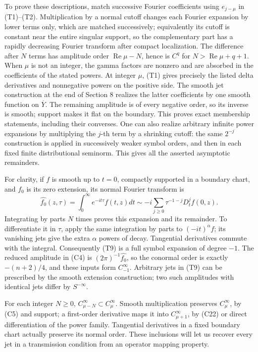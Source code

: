 \documentclass[
  11pt,
]{article}
\begin{document}
To prove these descriptions, match successive Fourier coefficients using
\(e_{j-\mu}\) in (T1)--(T2). Multiplication by a normal cutoff changes
each Fourier expansion by lower terms only, which are matched
successively; equivalently its cutoff is constant near the entire
singular support, so the complementary part has a rapidly decreasing
Fourier transform after compact localization. The difference after \(N\)
terms has amplitude order \(\operatorname{Re}\mu-N\), hence is \(C^q\)
for \(N>\operatorname{Re}\mu+q+1\). When \(\mu\) is not an integer, the
gamma factors are nonzero and are absorbed in the coefficients of the
stated powers. At integer \(\mu\), (T1) gives precisely the listed delta
derivatives and nonnegative powers on the positive side. The smooth jet
construction at the end of Section 8 realizes the latter coefficients by
one smooth function on \(\overline Y\). The remaining amplitude is of
every negative order, so its inverse is smooth; support makes it flat on
the boundary. This proves exact membership statements, including their
converses. One can also realize arbitrary infinite power expansions by
multiplying the \(j\)-th term by a shrinking cutoff: the same \(2^{-j}\)
construction is applied in successively weaker symbol orders, and then
in each fixed finite distributional seminorm. This gives all the
asserted asymptotic remainders.

For clarity, if \(f\) is smooth up to \(t=0\), compactly supported in a
boundary chart, and \(f_0\) is its zero extension, its normal Fourier
transform is \[
\widehat {f_0}(z,\tau)=\int_0^\infty e^{-it\tau}f(t,z)dt
\sim-i\sum_{j\geq0}\tau^{-1-j}D_t^j f(0,z).
\tag{T9}
\] Integrating by parts \(N\) times proves this expansion and its
remainder. To differentiate it in \(\tau\), apply the same integration
by parts to \((-it)^\alpha f\); its vanishing jets give the extra
\(\alpha\) powers of decay. Tangential derivatives commute with the
integral. Consequently (T9) is a full symbol expansion of degree \(-1\).
The reduced amplitude in (C4) is \((2\pi)^{-1}\widehat {f_0}\), so the
conormal order is exactly \(-(n+2)/4\), and these inputs form
\(C_{-1}^\infty\). Arbitrary jets in (T9) can be prescribed by the
smooth extension construction; two such amplitudes with identical jets
differ by \(S^{-\infty}\).

For each integer \(N\geq0\), \(C_{\mu-N}^\infty\subset C_\mu^\infty\).
Smooth multiplication preserves \(C_\mu^\infty\), by (C5) and support; a
first-order derivative maps it into \(C_{\mu+1}^\infty\), by (C22) or
direct differentiation of the power family. Tangential derivatives in a
fixed boundary chart actually preserve its normal order. These
inclusions will let us recover every jet in a transmission condition
from an operator mapping property.
\end{document}
